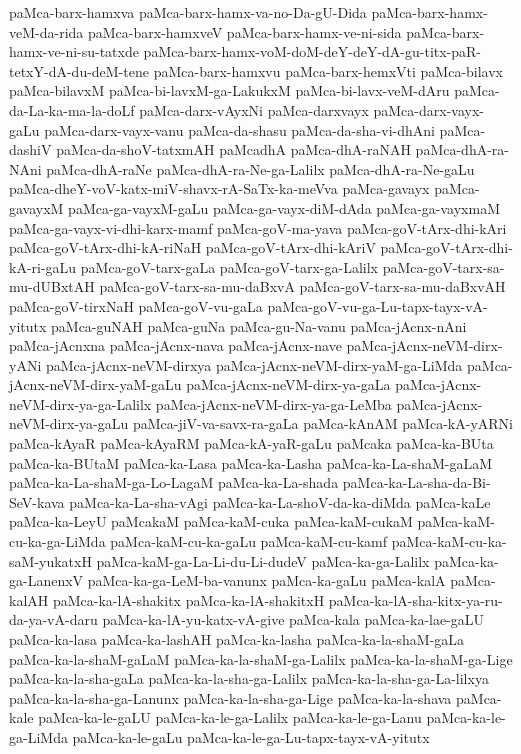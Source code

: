 {paMca-barx-hamxva
paMca-barx-hamx-va-no-Da-gU-Dida
paMca-barx-hamx-veM-da-rida
paMca-barx-hamxveV
paMca-barx-hamx-ve-ni-sida
paMca-barx-hamx-ve-ni-su-tatxde
paMca-barx-hamx-voM-doM-deY-deY-dA-gu-titx-paR-tetxY-dA-du-deM-tene
paMca-barx-hamxvu
paMca-barx-hemxVti
paMca-bilavx
paMca-bilavxM
paMca-bi-lavxM-ga-LakukxM
paMca-bi-lavx-veM-dAru
paMca-da-La-ka-ma-la-doLf
paMca-darx-vAyxNi
paMca-darxvayx
paMca-darx-vayx-gaLu
paMca-darx-vayx-vanu
paMca-da-shasu
paMca-da-sha-vi-dhAni
paMca-dashiV
paMca-da-shoV-tatxmAH
paMcadhA
paMca-dhA-raNAH
paMca-dhA-ra-NAni
paMca-dhA-raNe
paMca-dhA-ra-Ne-ga-Lalilx
paMca-dhA-ra-Ne-gaLu
paMca-dheY-voV-katx-miV-shavx-rA-SaTx-ka-meVva
paMca-gavayx
paMca-gavayxM
paMca-ga-vayxM-gaLu
paMca-ga-vayx-diM-dAda
paMca-ga-vayxmaM
paMca-ga-vayx-vi-dhi-karx-mamf
paMca-goV-ma-yava
paMca-goV-tArx-dhi-kAri
paMca-goV-tArx-dhi-kA-riNaH
paMca-goV-tArx-dhi-kAriV
paMca-goV-tArx-dhi-kA-ri-gaLu
paMca-goV-tarx-gaLa
paMca-goV-tarx-ga-Lalilx
paMca-goV-tarx-sa-mu-dUBxtAH
paMca-goV-tarx-sa-mu-daBxvA
paMca-goV-tarx-sa-mu-daBxvAH
paMca-goV-tirxNaH
paMca-goV-vu-gaLa
paMca-goV-vu-ga-Lu-tapx-tayx-vA-yitutx
paMca-guNAH
paMca-guNa
paMca-gu-Na-vanu
paMca-jAcnx-nAni
paMca-jAcnxna
paMca-jAcnx-nava
paMca-jAcnx-nave
paMca-jAcnx-neVM-dirx-yANi
paMca-jAcnx-neVM-dirxya
paMca-jAcnx-neVM-dirx-yaM-ga-LiMda
paMca-jAcnx-neVM-dirx-yaM-gaLu
paMca-jAcnx-neVM-dirx-ya-gaLa
paMca-jAcnx-neVM-dirx-ya-ga-Lalilx
paMca-jAcnx-neVM-dirx-ya-ga-LeMba
paMca-jAcnx-neVM-dirx-ya-gaLu
paMca-jiV-va-savx-ra-gaLa
paMca-kAnAM
paMca-kA-yARNi
paMca-kAyaR
paMca-kAyaRM
paMca-kA-yaR-gaLu
paMcaka
paMca-ka-BUta
paMca-ka-BUtaM
paMca-ka-Lasa
paMca-ka-Lasha
paMca-ka-La-shaM-gaLaM
paMca-ka-La-shaM-ga-Lo-LagaM
paMca-ka-La-shada
paMca-ka-La-sha-da-Bi-SeV-kava
paMca-ka-La-sha-vAgi
paMca-ka-La-shoV-da-ka-diMda
paMca-kaLe
paMca-ka-LeyU
paMcakaM
paMca-kaM-cuka
paMca-kaM-cukaM
paMca-kaM-cu-ka-ga-LiMda
paMca-kaM-cu-ka-gaLu
paMca-kaM-cu-kamf
paMca-kaM-cu-ka-saM-yukatxH
paMca-kaM-ga-La-Li-du-Li-dudeV
paMca-ka-ga-Lalilx
paMca-ka-ga-LanenxV
paMca-ka-ga-LeM-ba-vanunx
paMca-ka-gaLu
paMca-kalA
paMca-kalAH
paMca-ka-lA-shakitx
paMca-ka-lA-shakitxH
paMca-ka-lA-sha-kitx-ya-ru-da-ya-vA-daru
paMca-ka-lA-yu-katx-vA-give
paMca-kala
paMca-ka-lae-gaLU
paMca-ka-lasa
paMca-ka-lashAH
paMca-ka-lasha
paMca-ka-la-shaM-gaLa
paMca-ka-la-shaM-gaLaM
paMca-ka-la-shaM-ga-Lalilx
paMca-ka-la-shaM-ga-Lige
paMca-ka-la-sha-gaLa
paMca-ka-la-sha-ga-Lalilx
paMca-ka-la-sha-ga-La-lilxya
paMca-ka-la-sha-ga-Lanunx
paMca-ka-la-sha-ga-Lige
paMca-ka-la-shava
paMca-kale
paMca-ka-le-gaLU
paMca-ka-le-ga-Lalilx
paMca-ka-le-ga-Lanu
paMca-ka-le-ga-LiMda
paMca-ka-le-gaLu
paMca-ka-le-ga-Lu-tapx-tayx-vA-yitutx
}
